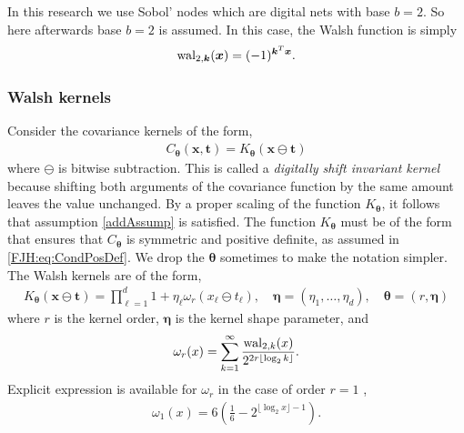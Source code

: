 \documentclass{svjour3}                     %
\let\vec\relax
\newcommand{\bm}[1]{\boldsymbol{#1}}
\newcommand{\veta}{{\bm{\eta}}}
\newcommand{\vtheta}{{\bm{\theta}}}
\newcommand{\vk}{\bm{k}}
\newcommand{\vt}{\bm{t}}
\newcommand{\vx}{\bm{x}}
\newcommand{\JRNote}[1]{{\textcolor{green}{JR: #1}}}
\begin{document}
In this research we use Sobol' nodes which are digital nets with base $b=2$. So here afterwards base $b=2$ is assumed. %
In this case, the Walsh function is simply $$\textup{wal}_{2,\vk} (\vx) = (-1)^{\vec{\vk}^T \vec{\vx}}.$$

\subsubsection{Walsh kernels}
Consider the covariance kernels of the form,
\begin{align}
\label{eqn:digital_shift_in_kernel}
C_{\vtheta}(\vx, \vt) = K_{\vtheta} (\vx \ominus \vt) 
\end{align}
where $\ominus$ is bitwise subtraction.
This is called a \emph{digitally shift invariant kernel} because shifting both arguments of the covariance function by the same amount leaves the value unchanged. By a proper scaling of the function $K_{\vtheta}$, it follows that assumption \eqref{addAssump} is satisfied. The function $K_{\vtheta}$ must be of the form that ensures that $C_{\vtheta}$ is symmetric and positive definite, as assumed in \eqref{FJH:eq:CondPosDef}. We drop the ${\vtheta}$ sometimes to make the notation simpler.
The Walsh kernels are of the form,
\begin{align}
\label{eqn:walsh_kernel}
K_{\vtheta} (\vx \ominus \vt) =  
\prod_{\ell=1}^d  1 + \eta_\ell \omega_{r} (x_\ell \ominus t_\ell), \quad \veta = (\eta_1, \dots, \eta_d), \quad \vtheta = (r, \veta)
\end{align}
where $r$ is the kernel order, $\veta$ is the kernel shape parameter, and
\begin{align*}
\omega_r(x) = \sum_{k=1}^\infty 
\frac{\textup{wal}_{2,k}(x) }{2^{2r \lfloor \log_2 k \rfloor}}.
\end{align*}
Explicit expression is available for $\omega_{r}$ in the case of order $r=1$ \cite{Nuyens2013}, %
\begin{align}
\label{eqn:omega1}
\omega_1(x) 
= 6\left( \frac 16 - 2^{\lfloor \log_2 x \rfloor -1 }\right).
\end{align}
\end{document}
